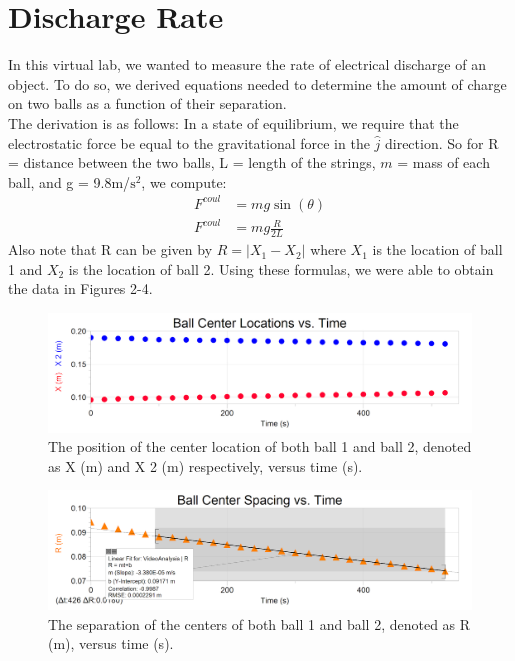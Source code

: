 \documentclass[oneside,12pt]{amsart}
\begin{document}
	\section{Discharge Rate}
	In this virtual lab, we wanted to measure the rate of electrical discharge of an object. To do so, we derived equations needed to determine the amount of charge on two balls as a function of their separation.\\
	
	The derivation is as follows: In a state of equilibrium, we require that the electrostatic force be equal to the gravitational force in the $\hat{j}$ direction. So for R = distance between the two balls, L = length of the strings, $m$ = mass of each ball, and g = 9.8m/$\text{s}^2$, we compute:
	\begin{align*}
		F^{coul} &= mg \sin(\theta)\\
		F^{coul} &= mg \frac{R}{2L}
	\end{align*}
	Also note that R can be given by $R = |X_1-X_2|$ where $X_1$ is the location of ball 1 and $X_2$ is the location of ball 2. Using these formulas, we were able to obtain the data in Figures 2-4.\\
	 
		\begin{figure}[h]
		\includegraphics[width=\linewidth,scale=0.01]{LocvTime.png}
		\caption{The position of the center location of both ball 1 and ball 2, denoted as X (m) and X 2 (m) respectively, versus time (s).}
		\label{loc}
	\end{figure}
\begin{figure}[h]
	\includegraphics[width=\linewidth,scale=0.01]{SpacevTime.png}
	\caption{The separation of the centers of both ball 1 and ball 2, denoted as R (m), versus time (s).}
	\label{Space}
\end{figure}
\end{document}
